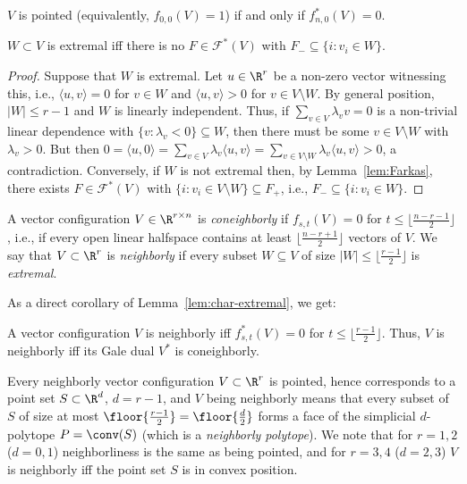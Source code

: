 \begin{corollary}
$V$ is pointed (equivalently, $f_{0,0}(V)=1$) if and only if $f^*_{n,0}(V)=0$.
\end{corollary}
%
\begin{lemma} 
\label{lem:char-extremal}
$W \subset V$ is extremal iff there is no $F\in \mathcal{F}^*(V)$ with $F_- \subseteq \{i\colon v_i \in W\}$.
\end{lemma}
\begin{proof}
Suppose that $W$ is extremal. Let $u\in \R^r$ be a non-zero vector witnessing this, i.e., $\langle u, v\rangle =0$ for $v \in W$ and $\langle u, v\rangle >0$ for $v\in V\setminus W$. By general position, $|W|\leq r-1$ and $W$ is linearly independent. Thus, if $\sum_{v\in V} \lambda_v v=0$ is a non-trivial linear dependence with $\{v \colon \lambda_v<0\}\subseteq W$, then there must be some $v \in V\setminus W$  with $\lambda_v > 0$. But then $0=\langle u,0\rangle = \sum_{v\in V} \lambda_v \langle u,v\rangle =\sum_{v\in V\setminus W} \lambda_v \langle u,v\rangle >0$, a contradiction.
%
Conversely, if $W$ is not extremal then, by Lemma~\ref{lem:Farkas}, there exists $F \in \mathcal{F}^*(V)$ with $\{i \colon v_i\in V\setminus W\} \subseteq F_+$, i.e., $F_- \subseteq \{i\colon v_i \in W\}$.
\end{proof}
%
\begin{definition} A vector configuration $V\in \R^{r \times n}$ is \emph{coneighborly} if $f_{s,t}(V) = 0$ for $t \leq \lfloor \frac{n-r-1}{2} \rfloor$, i.e., if every open linear halfspace contains at least $\lfloor \frac{n-r+1}{2} \rfloor$ vectors of $V$. 
%
We say that  $V \subset \R^r$ is \emph{neighborly} if every subset $W \subseteq V$ of size $|W| \leq \lfloor \frac{r-1}{2} \rfloor$ is \emph{extremal}.
\end{definition}
%
As a direct corollary of Lemma~\ref{lem:char-extremal}, we get:
\begin{corollary} 
\label{cor:neighborly-alternative}
A vector configuration  $V$ is neighborly iff $f^*_{s,t}(V)=0$ for $t \leq \lfloor \frac{r-1}{2} \rfloor$. Thus, $V$ is neighborly iff its Gale dual $V^*$ is coneighborly.
\end{corollary}
%
Every neighborly vector configuration $V \subset \R^r$ is pointed, hence corresponds to a point set $S\subset \R^d$, $d=r-1$, and $V$ being neighborly means that every subset of $S$ of size at most $\floor{\frac{r-1}{2}}=\floor{\frac{d}{2}}$ forms a face of the simplicial $d$-polytope $P=\conv(S)$ (which is a \emph{neighborly polytope}). We note that for $r=1,2$ ($d=0,1$) neighborliness is the same as being pointed, and for $r=3,4$ ($d=2,3$) $V$ is neighborly iff the point set $S$ is in convex position.

